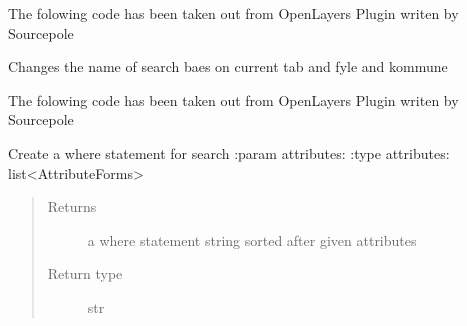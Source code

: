 \documentclass[letterpaper,10pt,english]{sphinxmanual}
\begin{document}
\begin{fulllineitems}
\begin{fulllineitems}
\label{\detokenize{code:Tilgjengelighet.Tilgjengelighet.canvasCrs}}
The folowing code has been taken out from OpenLayers Plugin writen by Sourcepole

\end{fulllineitems}


\begin{fulllineitems}
\label{\detokenize{code:Tilgjengelighet.Tilgjengelighet.change_search_name}}
Changes the name of search baes on current tab and fyle and kommune

\end{fulllineitems}


\begin{fulllineitems}
\label{\detokenize{code:Tilgjengelighet.Tilgjengelighet.createGdalTmsLayer}}
The folowing code has been taken out from OpenLayers Plugin writen by Sourcepole

\end{fulllineitems}


\begin{fulllineitems}
\label{\detokenize{code:Tilgjengelighet.Tilgjengelighet.create_where_statement}}
Create a where statement for search
:param attributes:
:type attributes: list\textless{}AttributeForms\textgreater{}
\begin{quote}\begin{description}
\item[{Returns}] \leavevmode
a where statement string sorted after given attributes

\item[{Return type}] \leavevmode
str

\end{description}\end{quote}


\end{fulllineitems}
\end{fulllineitems}
\end{document}
